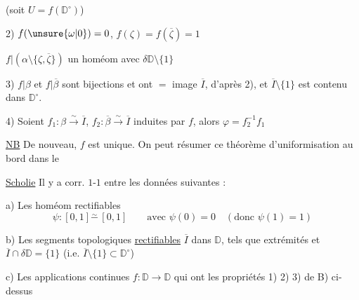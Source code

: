 (soit $U=f(\mathbb D^\circ)$)


2) $f(\unsure{\omega|0})=0$, $f(\zeta)=f(\overline\zeta)=1$

$f|(\alpha\setminus\{\zeta,\overline\zeta\})$  un
homéom avec $\delta\mathbb D\setminus\{1\}$

3)  $f|\beta$ et $f|\overline\beta$ sont bijections et
ont $=$ image $\overline I$,  d'après
2), et $\overline I\setminus\{1\}$ est contenu dans $\mathbb D^\circ$.

4) Soient $f_1:\beta\overset\sim\longrightarrow\overline I$, $f_2:\overline\beta\overset\sim\longrightarrow\overline I$ induites par $f$,
alors $\varphi=f_2^{-1}f_1$

\uline{NB} De nouveau, $f$ est unique. On peut
résumer ce théorème d'uniformisation
au bord dans le 

\uline{Scholie} Il y a corr. $1$-$1$ entre les
données suivantes :

a) Les homéom rectifiables 
\[
\psi:[0,1]\overset\sim-\,[0,1]
\qquad\text{avec }\psi(0)=0\quad(\text{donc }\psi(1)=1)
\]

b) Les segments topologiques \uline{rectifiables}
$\overline I$ dans $\mathbb D$, tels que
extrémités et 
$\overline I\cap\delta\mathbb D=\{1\}$ (i.e.
$\overline I\setminus\{1\}\subset\mathbb D^\circ$)

c) Les  applications continues $f:\mathbb D\longrightarrow\mathbb D$
qui ont les propriétés 1) 2) 3) de B) ci-dessus

